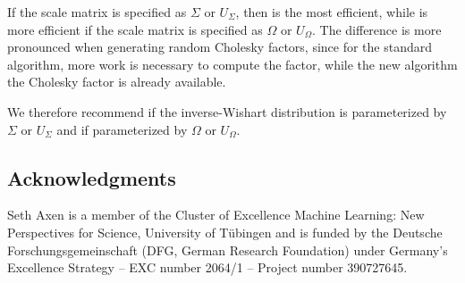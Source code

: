 \documentclass[12pt,a4paper,reqno]{amsart}
\numberwithin{equation}{section}
\begin{document}
If the scale matrix is specified as $\Sigma$ or $U_\Sigma$, then  is the most efficient, while  is more efficient if the scale matrix is specified as $\Omega$ or $U_\Omega$.
The difference is more pronounced when generating random Cholesky factors, since for the standard algorithm, more work is necessary to compute the factor, while the new algorithm the Cholesky factor is already available.

We therefore recommend  if the inverse-Wishart distribution is parameterized by $\Sigma$ or $U_\Sigma$ and  if parameterized by $\Omega$ or $U_\Omega$.




\subsection*{Acknowledgments}

Seth Axen is a member of the Cluster of Excellence Machine Learning: New Perspectives for Science, University of Tübingen and is funded by the Deutsche Forschungsgemeinschaft (DFG, German Research Foundation) under Germany’s Excellence Strategy – EXC number 2064/1 – Project number 390727645.

\printbibliography

\newpage




\end{document}
